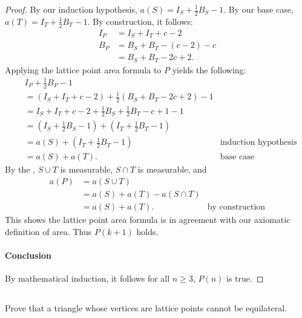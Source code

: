 \documentclass{report}
\begin{document}
\begin{proof}
    By our induction hypothesis, $a(S) = I_S + \frac{1}{2}B_S - 1$.
    By our base case, $a(T) = I_T + \frac{1}{2}B_T - 1$.
    By construction, it follows:
      \begin{align*}
        I_P & = I_S + I_T + c - 2 \\
        B_P & = B_S + B_T - (c - 2) - c \\
            & = B_S + B_T - 2c + 2.
      \end{align*}
    Applying the lattice point area formula to $P$ yields the following:
      \begin{align*}
        & I_P + \frac{1}{2}B_P - 1 \\
          & = (I_S + I_T + c - 2) + \frac{1}{2}(B_S + B_T - 2c + 2) - 1 \\
          & = I_S + I_T + c - 2 + \frac{1}{2}B_S + \frac{1}{2}B_T - c + 1 - 1 \\
          & = (I_S + \frac{1}{2}B_S - 1) + (I_T + \frac{1}{2}B_T - 1) \\
          & = a(S) + (I_T + \frac{1}{2}B_T - 1) & \text{induction hypothesis} \\
          & = a(S) + a(T). & \text{base case}
      \end{align*}
    By the , $S \cup T$ is measurable,
      $S \cap T$ is measurable, and
      \begin{align*}
        a(P)
          & = a(S \cup T) \\
          & = a(S) + a(T) - a(S \cap T) \\
          & = a(S) + a(T). & \text{by construction}
      \end{align*}
    This shows the lattice point area formula is in agreement with our axiomatic
      definition of area.
    Thus $P(k + 1)$ holds.

  \paragraph{Conclusion}%

    By mathematical induction, it follows for all $n \geq 3$, $P(n)$ is true.

\end{proof}

\subsection{}%
\label{sub:exercise-1.7.5}

Prove that a triangle whose vertices are lattice points cannot be equilateral.
\end{document}
